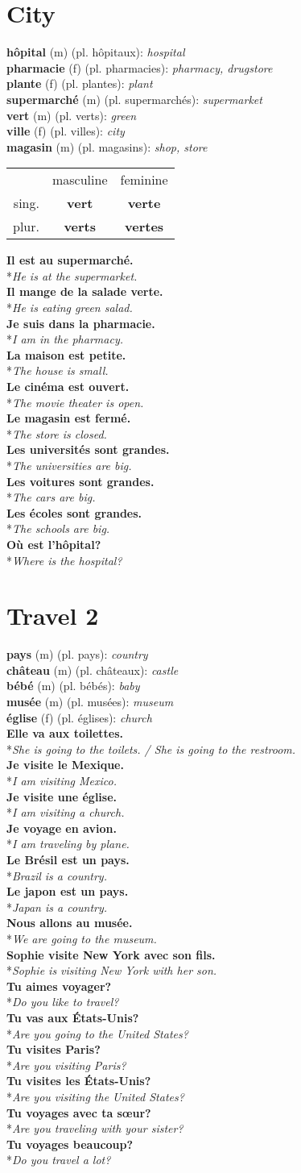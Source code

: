 \documentclass[a4paper,11pt,oneside]{book}
\newcommand{\phrase}[2]{\noindent\textbf{#1}\\*\-\hspace{0.5cm}\textit{#2}\\}
\newcommand{\noundecl}[4]{
\begin{tabular}{rcc}
 & masculine & feminine \\
 sing. & \textbf{#1} & \textbf{#2} \\
 plur. & \textbf{#3} & \textbf{#4}
\end{tabular}
}
\newcommand{\noundef}[4]{\textbf{#1} (#3) (pl. #2): \textit{#4}\\}
\begin{document}
\section{City}

\noundef{hôpital}{hôpitaux}{m}{hospital}
\noundef{pharmacie}{pharmacies}{f}{pharmacy, drugstore}
\noundef{plante}{plantes}{f}{plant}
\noundef{supermarché}{supermarchés}{m}{supermarket}
\noundef{vert}{verts}{m}{green}
\noundef{ville}{villes}{f}{city}
\noundef{magasin}{magasins}{m}{shop, store}

\begin{center}
\noundecl{vert}{verte}{verts}{vertes}
\end{center}

\phrase{Il est au supermarché.}{He is at the supermarket.}
\phrase{Il mange de la salade verte.}{He is eating green salad.}
\phrase{Je suis dans la pharmacie.}{I am in the pharmacy.}
\phrase{La maison est petite.}{The house is small.}
\phrase{Le cinéma est ouvert.}{The movie theater is open.}
\phrase{Le magasin est fermé.}{The store is closed.}
\phrase{Les universités sont grandes.}{The universities are big.}
\phrase{Les voitures sont grandes.}{The cars are big.}
\phrase{Les écoles sont grandes.}{The schools are big.}
\phrase{Où est l'hôpital?}{Where is the hospital?}

\section{Travel 2}

\noundef{pays}{pays}{m}{country}
\noundef{château}{châteaux}{m}{castle}
\noundef{bébé}{bébés}{m}{baby}
\noundef{musée}{musées}{m}{museum}
\noundef{église}{églises}{f}{church}

\phrase{Elle va aux toilettes.}{She is going to the toilets. / She is going to the restroom.}
\phrase{Je visite le Mexique.}{I am visiting Mexico.}
\phrase{Je visite une église.}{I am visiting a church.}
\phrase{Je voyage en avion.}{I am traveling by plane.}
\phrase{Le Brésil est un pays.}{Brazil is a country.}
\phrase{Le japon est un pays.}{Japan is a country.}
\phrase{Nous allons au musée.}{We are going to the museum.}
\phrase{Sophie visite New York avec son fils.}{Sophie is visiting New York with her son.}
\phrase{Tu aimes voyager?}{Do you like to travel?}
\phrase{Tu vas aux États-Unis?}{Are you going to the United States?}
\phrase{Tu visites Paris?}{Are you visiting Paris?}
\phrase{Tu visites les États-Unis?}{Are you visiting the United States?}
\phrase{Tu voyages avec ta sœur?}{Are you traveling with your sister?}
\phrase{Tu voyages beaucoup?}{Do you travel a lot?}
\end{document}
